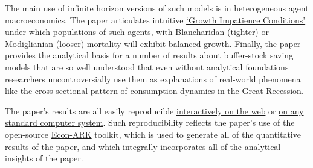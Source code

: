 \documentclass[BufferStockTheory]{subfiles}
\begin{document}
The main use of infinite horizon versions of such models is in heterogeneous agent macroeconomics. The paper articulates intuitive \href{https://econ-ark.github.io/BufferStockTheory#GICAgg}{`Growth Impatience Conditions'} under which populations of such agents, with Blancharidan (tighter) or Modiglianian (looser) mortality will exhibit balanced growth.  Finally, the paper provides the analytical basis for a number of results about buffer-stock saving models that are so well understood that even without analytical foundations researchers uncontroversially use them as explanations of real-world phenomena like the cross-sectional pattern of consumption dynamics in the Great Recession.

The paper's results are all easily reproducible \href{https://econ-ark.org/_materials/BufferStockTheory?launch}{interactively on the web} or \href{https://github.com/econ-ark/BufferStockTheory}{on any standard computer system}.  Such reproducibility reflects the paper's use of the open-source \href{https://econ-ark.org}{Econ-ARK} toolkit, which is used to generate all of the quantitative results of the paper, and which integrally incorporates all of the analytical insights of the paper.

\begin{equation*}
  \label{eq:Dummy}
\end{equation*}

\clearpage\vfill\eject

\onlyinsubfile{}
\end{document}
